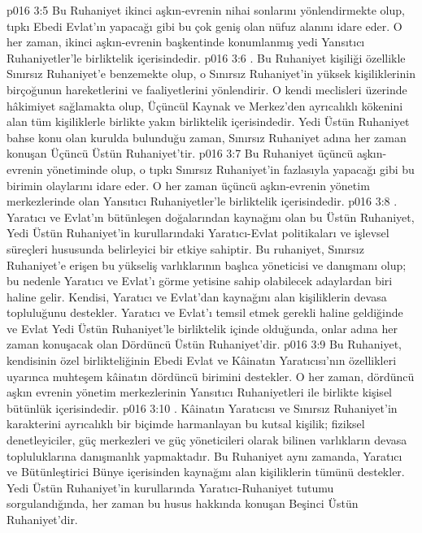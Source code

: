 \vs p016 3:5 Bu Ruhaniyet ikinci aşkın\hyp{}evrenin nihai sonlarını yönlendirmekte olup, tıpkı Ebedi Evlat’ın yapacağı gibi bu çok geniş olan nüfuz alanını idare eder. O her zaman, ikinci aşkın\hyp{}evrenin başkentinde konumlanmış yedi Yansıtıcı Ruhaniyetler’le birliktelik içerisindedir.
\vs p016 3:6 . Bu Ruhaniyet kişiliği özellikle Sınırsız Ruhaniyet’e benzemekte olup, o Sınırsız Ruhaniyet’in yüksek kişiliklerinin birçoğunun hareketlerini ve faaliyetlerini yönlendirir. O kendi meclisleri üzerinde hâkimiyet sağlamakta olup, Üçüncül Kaynak ve Merkez’den ayrıcalıklı kökenini alan tüm kişiliklerle birlikte yakın birliktelik içerisindedir. Yedi Üstün Ruhaniyet bahse konu olan kurulda bulunduğu zaman, Sınırsız Ruhaniyet adına her zaman konuşan Üçüncü Üstün Ruhaniyet’tir.
\vs p016 3:7 Bu Ruhaniyet üçüncü aşkın\hyp{}evrenin yönetiminde olup, o tıpkı Sınırsız Ruhaniyet’in fazlasıyla yapacağı gibi bu birimin olaylarını idare eder. O her zaman üçüncü aşkın\hyp{}evrenin yönetim merkezlerinde olan Yansıtıcı Ruhaniyetler’le birliktelik içerisindedir.
\vs p016 3:8 . Yaratıcı ve Evlat’ın bütünleşen doğalarından kaynağını olan bu Üstün Ruhaniyet, Yedi Üstün Ruhaniyet’in kurullarındaki Yaratıcı\hyp{}Evlat politikaları ve işlevsel süreçleri hususunda belirleyici bir etkiye sahiptir. Bu ruhaniyet, Sınırsız Ruhaniyet’e erişen bu yükseliş varlıklarının başlıca yöneticisi ve danışmanı olup; bu nedenle Yaratıcı ve Evlat’ı görme yetisine sahip olabilecek adaylardan biri haline gelir. Kendisi, Yaratıcı ve Evlat’dan kaynağını alan kişiliklerin devasa topluluğunu destekler. Yaratıcı ve Evlat’ı temsil etmek gerekli haline geldiğinde ve Evlat Yedi Üstün Ruhaniyet’le birliktelik içinde olduğunda, onlar adına her zaman konuşacak olan Dördüncü Üstün Ruhaniyet’dir.
\vs p016 3:9 Bu Ruhaniyet, kendisinin özel birlikteliğinin Ebedi Evlat ve Kâinatın Yaratıcısı’nın özellikleri uyarınca muhteşem kâinatın dördüncü birimini destekler. O her zaman, dördüncü aşkın evrenin yönetim merkezlerinin Yansıtıcı Ruhaniyetleri ile birlikte kişisel bütünlük içerisindedir.
\vs p016 3:10 . Kâinatın Yaratıcısı ve Sınırsız Ruhaniyet’in karakterini ayrıcalıklı bir biçimde harmanlayan bu kutsal kişilik; fiziksel denetleyiciler, güç merkezleri ve güç yöneticileri olarak bilinen varlıkların devasa topluluklarına danışmanlık yapmaktadır. Bu Ruhaniyet aynı zamanda, Yaratıcı ve Bütünleştirici Bünye içerisinden kaynağını alan kişiliklerin tümünü destekler. Yedi Üstün Ruhaniyet’in kurullarında Yaratıcı\hyp{}Ruhaniyet tutumu sorgulandığında, her zaman bu husus hakkında konuşan Beşinci Üstün Ruhaniyet’dir.
